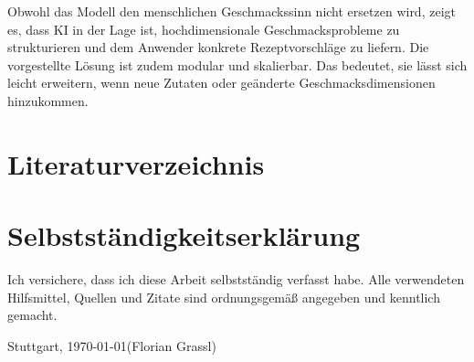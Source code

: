 \documentclass[12pt,a4paper]{report}
\begin{document}
Obwohl das Modell den menschlichen Geschmackssinn nicht ersetzen wird, zeigt es, dass KI in der Lage ist, hochdimensionale Geschmacksprobleme zu strukturieren und dem Anwender konkrete Rezeptvorschläge zu liefern. Die vorgestellte Lösung ist zudem modular und skalierbar. Das bedeutet, sie lässt sich leicht erweitern, wenn neue Zutaten oder geänderte Geschmacksdimensionen hinzukommen.

\clearpage
\chapter{Literaturverzeichnis}



\chapter*{Selbstständigkeitserklärung}
Ich versichere, dass ich diese Arbeit selbstständig verfasst habe. Alle verwendeten Hilfsmittel, Quellen und Zitate sind ordnungsgemäß angegeben und kenntlich gemacht.

\vspace{2cm}
Stuttgart, \today \hfill (Florian Grassl)
\end{document}
